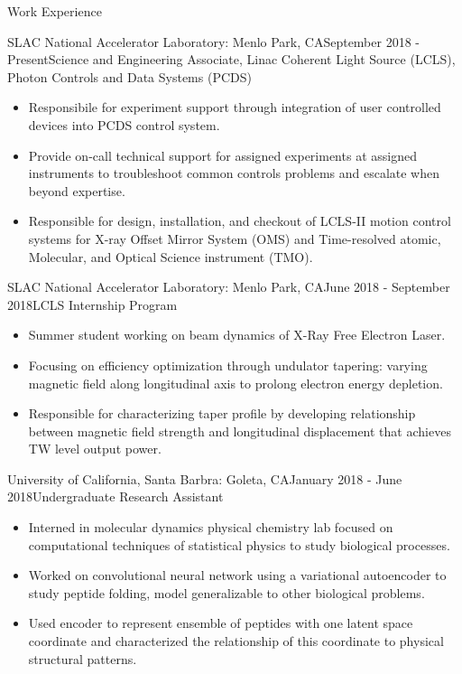 \documentclass{resume} %
\begin{document}
\begin{rSection}{Work Experience}
\begin{rSubsection}{SLAC National Accelerator Laboratory: Menlo Park, CA}{September 2018 - Present}{Science and Engineering Associate, Linac Coherent Light Source (LCLS), Photon Controls and Data Systems (PCDS)}{}
\begin{itemize}
    \item Responsibile for experiment support through integration of user controlled devices into PCDS control system.
    \item Provide on-call technical support for assigned experiments at assigned instruments to troubleshoot common controls problems and escalate when beyond expertise.
    \item Responsible for design, installation, and checkout of LCLS-II motion control systems for X-ray Offset Mirror System (OMS) and Time-resolved atomic, Molecular, and Optical Science instrument (TMO).
\end{itemize}
\end{rSubsection}

\begin{rSubsection}{SLAC National Accelerator Laboratory: Menlo Park, CA}{June 2018 - September 2018}{LCLS Internship Program}{}
\begin{itemize}
    \item Summer student working on beam dynamics of X-Ray Free Electron Laser.
    \item Focusing on efficiency optimization through undulator tapering: varying magnetic field along longitudinal axis to prolong electron energy depletion.
    \item Responsible for characterizing taper profile by developing relationship between magnetic field strength and longitudinal displacement that achieves TW level output power.
\end{itemize}
\end{rSubsection}

\begin{rSubsection}{University of California, Santa Barbra: Goleta, CA}{January 2018 - June 2018}{Undergraduate Research Assistant}{}
\begin{itemize}
    \item Interned in molecular dynamics physical chemistry lab focused on computational techniques of statistical physics to study biological processes.
    \item Worked on convolutional neural network using a variational autoencoder to study peptide folding, model generalizable to other biological problems.
    \item Used encoder to represent ensemble of peptides with one latent space coordinate and characterized the relationship of this coordinate to physical structural patterns.
\end{itemize}
\end{rSubsection}


\end{rSection}
\end{document}
